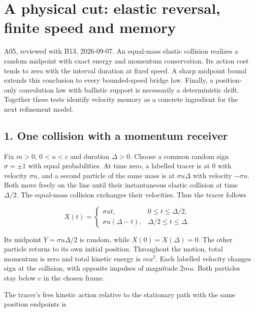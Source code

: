 \documentclass[11pt,a4paper]{article}
\begin{document}
\hypertarget{a-physical-cut-elastic-reversal-finite-speed-and-memory}{%
\section{A physical cut: elastic reversal, finite speed and
memory}\label{a-physical-cut-elastic-reversal-finite-speed-and-memory}}

A05, reviewed with B13, 2026-09-07. An equal-mass elastic collision
realizes a random midpoint with exact energy and momentum conservation.
Its action cost tends to zero with the interval duration at fixed speed.
A sharp midpoint bound extends this conclusion to every bounded-speed
bridge law. Finally, a position-only convolution law with ballistic
support is necessarily a deterministic drift. Together these tests
identify velocity memory as a concrete ingredient for the next
refinement model.

\hypertarget{one-collision-with-a-momentum-receiver}{%
\subsection{1. One collision with a momentum
receiver}\label{one-collision-with-a-momentum-receiver}}

Fix \(m>0\), \(0<u<c\) and duration \(\Delta>0\). Choose a common random
sign \(\sigma=\pm1\) with equal probabilities. At time zero, a labelled
tracer is at \(0\) with velocity \(\sigma u\), and a second particle of
the same mass is at \(\sigma u\Delta\) with velocity \(-\sigma u\). Both
move freely on the line until their instantaneous elastic collision at
time \(\Delta/2\). The equal-mass collision exchanges their velocities.
Thus the tracer follows

\[X(t)=\begin{cases}\sigma ut,&0\le t\le\Delta/2,\\
\sigma u(\Delta-t),&\Delta/2\le t\le\Delta.\end{cases}\]

Its midpoint \(Y=\sigma u\Delta/2\) is random, while
\(X(0)=X(\Delta)=0\). The other particle returns to its own initial
position. Throughout the motion, total momentum is zero and total
kinetic energy is \(mu^2\). Each labelled velocity changes sign at the
collision, with opposite impulses of magnitude \(2mu\). Both particles
stay below \(c\) in the chosen frame.

The tracer's free kinetic action relative to the stationary path with
the same position endpoints is
\end{document}
